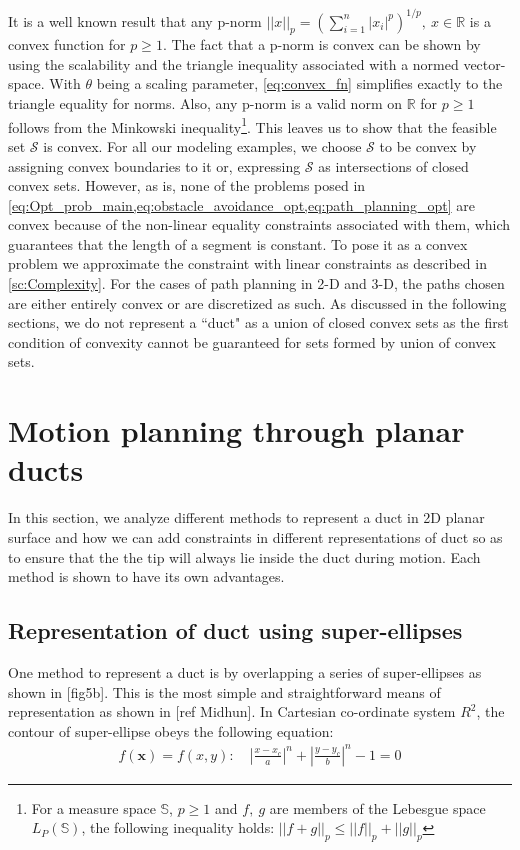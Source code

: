 \documentclass[12pt,a4]{article}
\begin{document}
It is a well known result that any p-norm $||x||_p=(\sum\limits_{i=1}^{n}|x_i|^p)^{1/p},~ x\in \mathbb{R}$ is a convex function for $p\geq 1$. The fact that a p-norm is convex can be shown by using the scalability and the triangle inequality associated with a normed vector-space. With $\theta$  being a scaling parameter, \cref{eq:convex_fn} simplifies exactly to the triangle equality for norms. Also, any p-norm is a valid norm on $\mathbb{R}$ for $p\geq1$ follows from the Minkowski inequality\footnote{For a measure space $\mathbb{S}$, $p\geq 1$ and $f,~g$ are members of the Lebesgue space $L_P(\mathbb{S})$, the following inequality holds: $||f+g||_p\leq ||f||_p+||g||_p$ }. This leaves us to show that the feasible set $\mathcal{S}$ is convex. For all our modeling examples, we choose $\mathcal{S}$ to be convex by assigning convex boundaries to it or, expressing $\mathcal{S}$ as intersections of closed convex sets.  However, as is, none of the problems posed in \cref{eq:Opt_prob_main,eq:obstacle_avoidance_opt,eq:path_planning_opt} are convex because of the non-linear equality constraints associated with them, which guarantees that the length of a segment is constant. To pose it as a convex problem we approximate the constraint with linear constraints as described in \cref{sc:Complexity}. For the cases of path planning in 2-D and 3-D, the paths chosen are either entirely convex or are discretized as such. As discussed in the following sections, we do not represent a ``duct" as a union of closed convex sets as the first condition of convexity cannot be guaranteed for sets formed by union of convex sets. 

\section{Motion planning through planar ducts}
%
In this section, we analyze different methods to represent a duct in 2D planar surface and how we can add constraints in different representations of duct so as to ensure that the the tip will always lie inside the duct during motion. Each method is shown to have its own advantages.
\subsection{Representation of duct using super-ellipses}
%
One method to represent a duct is by overlapping a series of super-ellipses as shown in [fig5b]. This is the most simple and straightforward means of representation as shown in [ref Midhun]. In Cartesian co-ordinate system $R^2$, the contour of super-ellipse obeys the following equation:
\begin{align}
f(\textbf{x})= f(x,y):\quad \left \vert \frac{x-x_c}{a} \right\vert^n+\left\vert \frac{y-y_c}{b} \right\vert^n-1=0
\end{align}
\end{document}

